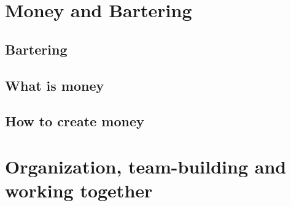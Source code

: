 \documentclass[ebook,12pt,oneside,openany]{memoir}
\begin{document}
\chapter{Money and Bartering}
\section{Bartering}
\section{What is money}
\section{How to create money}


\chapter{Organization, team-building and working together}
\end{document}
